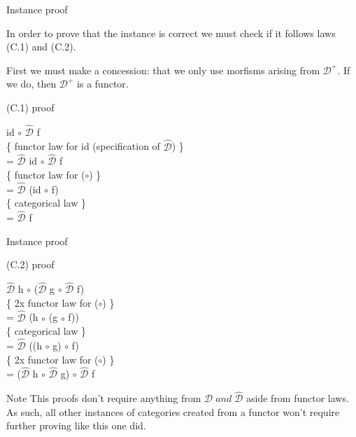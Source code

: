 \documentclass{beamer}
\theoremstyle{definition}
\theoremstyle{definition}
\theoremstyle{theorem}
\newcommand{\Varid}[1]{\mathit{#1}}
\begin{document}
\begin{frame}{Instance proof}

In order to prove that the instance is correct we must check if it follows laws (C.1) and (C.2).

First we must make a concession: that we only use morfisms arising from \ensuremath{\mathcal{D}^{+}}.
If we do, then \ensuremath{\mathcal{D}^{+}} is a functor.


\begin{block}{(C.1) proof}

id $\circ$ \ensuremath{\mathcal{\hat{D}}} f \\
\{ functor law for id (specification of \ensuremath{\mathcal{\hat{D}}}) \}\\
= \ensuremath{\mathcal{\hat{D}}} id $\circ$ \ensuremath{\mathcal{\hat{D}}} f \\
\{ functor law for ($\circ$) \}\\
= \ensuremath{\mathcal{\hat{D}}} (id $\circ$ f) \\
\{ categorical law \}\\
= \ensuremath{\mathcal{\hat{D}}} f 
\end{block}

\end{frame}


\begin{frame}{Instance proof}

\begin{block}{(C.2) proof}

\ensuremath{\mathcal{\hat{D}}} h $\circ$ (\ensuremath{\mathcal{\hat{D}}} g $\circ$ \ensuremath{\mathcal{\hat{D}}} f)\\
\{ 2x functor law for ($\circ$) \}\\
= \ensuremath{\mathcal{\hat{D}}} (h $\circ$ (g $\circ$ f))\\ 
\{ categorical law \}\\
= \ensuremath{\mathcal{\hat{D}}} ((h $\circ$ g) $\circ$ f)\\
\{ 2x functor law for ($\circ$) \}\\
= (\ensuremath{\mathcal{\hat{D}}} h $\circ$ \ensuremath{\mathcal{\hat{D}}} g) $\circ$ \ensuremath{\mathcal{\hat{D}}} f 

\end{block}

\begin{alertblock}{Note}
This proofs don't require anything from \ensuremath{\mathcal{D}\;\Varid{and}\;\mathcal{\hat{D}}} aside from functor laws.
As such, all other instances of categories created from a functor won't require further proving like this one did.

\end{alertblock}
\end{frame}
\end{document}

